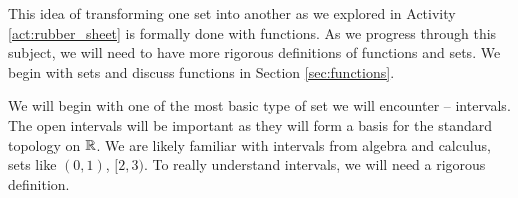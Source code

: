 \begin{comment}

\ActivitySolution
\ba
\item 
	\begin{enumerate}[i.]  
	\item We can take the unit circle and fix the points where the circle intersects the coordinate axes. Push the remaining points on the circle toward the square in a radial manner. This deforms the circle onto the square.
	\item In order to make the letter \texttt{S}, we would have to cut the circle. Since this is not allowed, we cannot deform the circle to the letter $\texttt{S}$.
	\item Think of the circle as being inscribed inside the star. Then push out the portions of the circle that are not on the star toward the arms. This deforms the circle onto the star.
	\item Consider the unit circle as our circle. Project the left half of the circle onto the $y$-axis. This deforms the circle onto the letter \texttt{D}.	
	\end{enumerate}

\item  Smash down the top half of the sphere onto the bottom half. This makes a bowl. To make a doughnut or a coffee mug with a handle, we would have to punch a hole in the sphere. So the sphere and the bowl can be deformed onto one another, but neither can be deformed into a doughnut or a coffee mug.  However, we can deform a coffee mug into a doughnut (see \url{https://en.wikipedia.org/wiki/File:Mug_and_Torus_morph.gif}) for an animation. The process involves molding the mug part around the handle until the result is a doughnut. This process can be reversed, so a coffee mug and a doughnut can be deformed into each other.  

\ea


\end{comment}

This idea of transforming one set into another as we explored in Activity \ref{act:rubber_sheet} is formally done with functions. As we progress through this subject, we will need to have more rigorous definitions of functions and sets. We begin with sets and discuss functions in Section \ref{sec:functions}. 


We will begin with one of the most basic type of set we will encounter -- intervals. The open intervals will be important as they will form a basis for the standard topology on $\mathbb{R}$. We are likely familiar with intervals from algebra and calculus, sets like $(0,1)$, $[2,3)$. To really understand intervals, we will need a rigorous definition.


